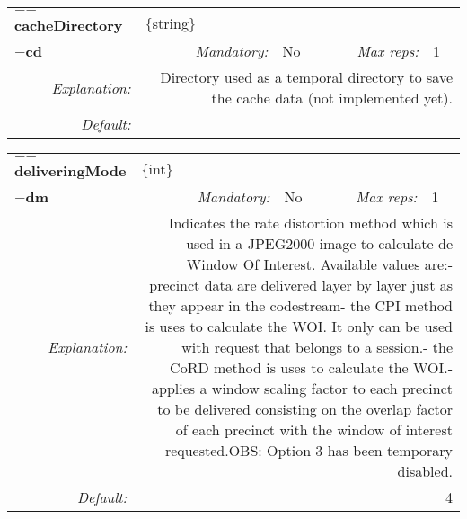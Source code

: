 \begin{center}\begin{tabular}{|rr|rl|rl|}
\hline
\multicolumn{2}{|l|}{\textbf{$-$$-$cacheDirectory}} & \multicolumn{4}{|l|}{$\{$string$\}$} \\
\cline{3-6}
\multicolumn{2}{|l|}{\textbf{$-$cd}} & \emph{Mandatory:} & No & \emph{Max reps:} & 1 \\
\hline
\emph{Explanation:} & \multicolumn{5}{|p{12cm}|}{Directory used as a temporal directory to save the cache data (not implemented yet).} \\
\hline
\emph{Default:} & \multicolumn{5}{|p{12cm}|}{} \\
\hline
\end{tabular}\end{center}
\begin{center}\begin{tabular}{|rr|rl|rl|}
\hline
\multicolumn{2}{|l|}{\textbf{$-$$-$deliveringMode}} & \multicolumn{4}{|l|}{$\{$int$\}$} \\
\cline{3-6}
\multicolumn{2}{|l|}{\textbf{$-$dm}} & \emph{Mandatory:} & No & \emph{Max reps:} & 1 \\
\hline
\emph{Explanation:} & \multicolumn{5}{|p{12cm}|}{Indicates the rate distortion method which is used in a JPEG2000 image to calculate de Window Of Interest. Available values are:\newline	1- precinct data are delivered layer by layer just as they appear in the codestream\newline	 2- the CPI method is uses to calculate the WOI. It only can be used with request that belongs to a session.\newline	3- the CoRD method is uses to calculate the WOI.\newline	4- applies a window scaling factor to each precinct to be delivered consisting on the overlap factor of each precinct with the window of interest requested.\newline OBS: Option 3 has been temporary disabled.} \\
\hline
\emph{Default:} & \multicolumn{5}{|p{12cm}|}{4} \\
\hline
\end{tabular}\end{center}


